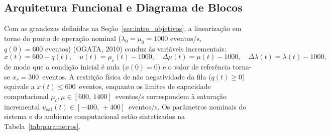\begin{figure}[H]
{%
}
\end{figure}

\subsection{Arquitetura Funcional e Diagrama de Blocos}\label{sec:arquitetura}
Com as grandezas definidas na Seção~\ref{sec:intro_objetivos}, a linearização em torno do ponto de operação nominal ($\lambda_0 = \mu_0 = 1000\text{ eventos/s}$, $q(0) = 600\text{ eventos}$) (OGATA, 2010) conduz às variáveis incrementais:
\begin{equation}
    x(t) = 600 - q(t), \quad u(t) = \mu_c(t) - 1000, \quad \Delta\mu(t) = \mu(t) - 1000, \quad \Delta\lambda(t) = \lambda(t) - 1000,
\end{equation}
de modo que a condição inicial é nula ($x(0) = 0$) e o valor de referência torna-se $x_r = 300$~eventos. A restrição física de não negatividade da fila ($q(t) \ge 0$) equivale a $x(t) \le 600$~eventos, enquanto os limites de capacidade computacional $\mu_c,\mu \in [600,\,1400]$~eventos/s correspondem à saturação incremental $u_{\text{sat}}(t) \in [-400,\,+400]$~eventos/s. Os parâmetros nominais do sistema e do ambiente computacional estão sintetizados na Tabela~\ref{tab:parametros}.

